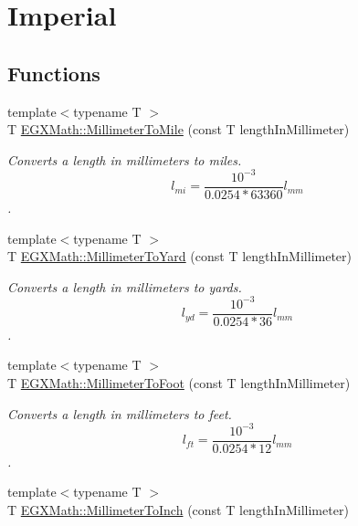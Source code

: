 \hypertarget{group___e_g_x_math-_conversions-_length_conversions-_s_i-_millimeter-_imperial}{}\section{Imperial}
\label{group___e_g_x_math-_conversions-_length_conversions-_s_i-_millimeter-_imperial}
\subsection*{Functions}
\begin{DoxyCompactItemize}
\item 
{\footnotesize template$<$typename T $>$ }\\T \mbox{\hyperlink{group___e_g_x_math-_conversions-_length_conversions-_s_i-_millimeter-_imperial_ga8a11dcd8f7866189b30e01d65e003e2d}{E\+G\+X\+Math\+::\+Millimeter\+To\+Mile}} (const T length\+In\+Millimeter)
\begin{DoxyCompactList}\small\item\em Converts a length in millimeters to miles. \[ l_{mi}=\frac{10^{-3}}{0.0254 * 63360} l_{mm} \]. \end{DoxyCompactList}\item 
{\footnotesize template$<$typename T $>$ }\\T \mbox{\hyperlink{group___e_g_x_math-_conversions-_length_conversions-_s_i-_millimeter-_imperial_gae1b144c2bc56f6591e0ee9b37f0653fa}{E\+G\+X\+Math\+::\+Millimeter\+To\+Yard}} (const T length\+In\+Millimeter)
\begin{DoxyCompactList}\small\item\em Converts a length in millimeters to yards. \[ l_{yd}= \frac{10^{-3}}{0.0254 * 36} l_{mm} \]. \end{DoxyCompactList}\item 
{\footnotesize template$<$typename T $>$ }\\T \mbox{\hyperlink{group___e_g_x_math-_conversions-_length_conversions-_s_i-_millimeter-_imperial_ga96513545d32f8e86044a3a3551840023}{E\+G\+X\+Math\+::\+Millimeter\+To\+Foot}} (const T length\+In\+Millimeter)
\begin{DoxyCompactList}\small\item\em Converts a length in millimeters to feet. \[ l_{ft}= \frac{10^{-3}}{0.0254 * 12} l_{mm} \]. \end{DoxyCompactList}\item 
{\footnotesize template$<$typename T $>$ }\\T \mbox{\hyperlink{group___e_g_x_math-_conversions-_length_conversions-_s_i-_millimeter-_imperial_gaaf0d8029c38ed975edf3805a0a3a53f7}{E\+G\+X\+Math\+::\+Millimeter\+To\+Inch}} (const T length\+In\+Millimeter)

\end{DoxyCompactItemize}

